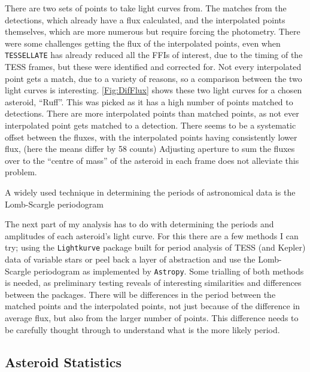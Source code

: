 \documentclass[12pt]{article}
\begin{document}
There are two sets of points to take light curves from. 
The matches from the detections, which already have a flux calculated, and the interpolated points themselves, which are more numerous but require forcing the photometry. 
There were some challenges getting the flux of the interpolated points, even when \texttt{TESSELLATE} has already reduced all the FFIs of interest, due to the timing of the TESS frames, but these were identified and corrected for.
Not every interpolated point gets a match, due to a variety of reasons, %
so a comparison between the two light curves is interesting. 
\autoref{Fig:DifFlux} shows these two light curves for a chosen asteroid, ``Ruff''. 
This was picked as it has a high number of points matched to detections.
There are more interpolated points than matched points, as not ever interpolated point gets matched to a detection.
There seems to be a systematic offset between the fluxes, with the interpolated points having consistently lower flux, (here the means differ by 58 counts)
Adjusting aperture to sum the fluxes over to the ``centre of mass'' of the asteroid in each frame does not alleviate this problem. 


A widely used technique in determining the periods of astronomical data is the Lomb-Scargle periodogram \citep[\citet{Lomb1976,Scargle1982}, but see][for a review]{VanderPlas2018}

The next part of my analysis has to do with determining the periods and amplitudes of each asteroid's light curve.
For this there are a few methods I can try; using the \texttt{Lightkurve} \citep{Lightkurve2018} package built for period analysis of TESS (and Kepler) data of variable stars or peel back a layer of abstraction and use the Lomb-Scargle periodogram as implemented by \texttt{Astropy}\cite{Astropy2022}. 
Some trialling of both methods is needed, as preliminary testing reveals of interesting similarities and differences between the packages. 
There will be differences in the period between the matched points and the interpolated points, not just because of the difference in average flux, but also from the larger number of points. This difference needs to be carefully thought through to understand what is the more likely period.

\subsection{Asteroid Statistics}\label{SubSec:StatMeth}
\end{document}
